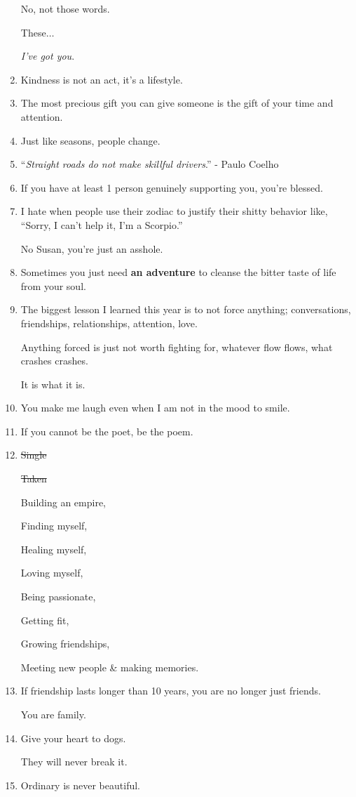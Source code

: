 \documentclass{article}
\begin{document}
\begin{enumerate}
	No, not those words.
	
	These$\ldots$
	
	\textit{I've got you}.
	\item Kindness is not an act, it's a lifestyle.
	\item The most precious gift you can give someone is the gift of your time and attention.
	\item Just like seasons, people change.
	\item ``\textit{Straight roads do not make skillful drivers}.'' - Paulo Coelho
	\item If you have at least 1 person genuinely supporting you, you're blessed.
	\item I hate when people use their zodiac to justify their shitty behavior like, ``Sorry, I can't help it, I'm a Scorpio.''
	
	No Susan, you're just an asshole.
	\item Sometimes you just need \textbf{an adventure} to cleanse the bitter taste of life from your soul.
	\item The biggest lesson I learned this year is to not force anything; conversations, friendships, relationships, attention, love.
	
	Anything forced is just not worth fighting for, whatever flow flows, what crashes crashes.
	
	It is what it is.
	\item You make me laugh even when I am not in the mood to smile.
	\item If you cannot be the poet, be the poem.
	\item \st{Single}
	
	\st{Taken}
	
	Building an empire,
	
	Finding myself,
	
	Healing myself,
	
	Loving myself,
	
	Being passionate,
	
	Getting fit,
	
	Growing friendships,
	
	Meeting new people \& making memories.
	\item If friendship lasts longer than 10 years, you are no longer just friends.
	
	You are family.
	\item Give your heart to dogs.
	
	They will never break it.
	\item Ordinary is never beautiful.
	

\end{enumerate}
\end{document}
